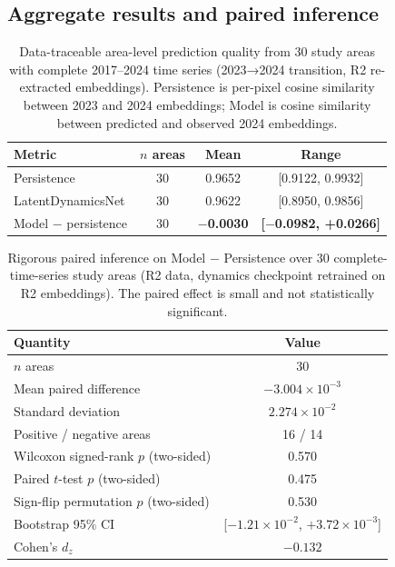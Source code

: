 \documentclass{article}
\begin{document}
\subsection{Aggregate results and paired inference}

\begin{table}[htbp]
\centering
\caption{Data-traceable area-level prediction quality from 30 study areas with complete 2017--2024 time series (2023→2024 transition, R2 re-extracted embeddings). Persistence is per-pixel cosine similarity between 2023 and 2024 embeddings; Model is cosine similarity between predicted and observed 2024 embeddings.}
\label{tab:aggregate}
\begin{tabular}{lccc}
\toprule
Metric & $n$ areas & Mean & Range \\
\midrule
Persistence & 30 & 0.9652 & [0.9122, 0.9932] \\
LatentDynamicsNet & 30 & 0.9622 & [0.8950, 0.9856] \\
Model $-$ persistence & 30 & \textbf{$-$0.0030} & \textbf{[$-$0.0982, +0.0266]} \\
\bottomrule
\end{tabular}
\end{table}

\begin{table}[htbp]
\centering
\caption{Rigorous paired inference on Model $-$ Persistence over 30 complete-time-series study areas (R2 data, dynamics checkpoint retrained on R2 embeddings). The paired effect is small and not statistically significant.}
\label{tab:paired_inference}
\small
\begin{tabular}{lc}
\toprule
Quantity & Value \\
\midrule
$n$ areas & 30 \\
Mean paired difference & $-3.004 \times 10^{-3}$ \\
Standard deviation & $2.274 \times 10^{-2}$ \\
Positive / negative areas & 16 / 14 \\
Wilcoxon signed-rank $p$ (two-sided) & 0.570 \\
Paired $t$-test $p$ (two-sided) & 0.475 \\
Sign-flip permutation $p$ (two-sided) & 0.530 \\
Bootstrap 95\% CI & [$-1.21\times10^{-2}$, $+3.72\times10^{-3}$] \\
Cohen's $d_z$ & $-0.132$ \\
\bottomrule
\end{tabular}
\end{table}
\end{document}
